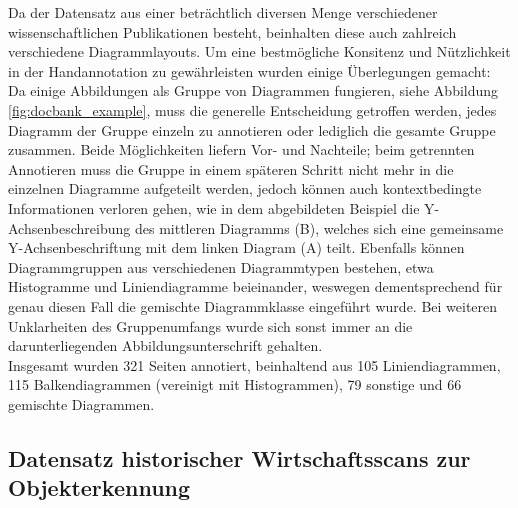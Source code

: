 Da der Datensatz aus einer beträchtlich diversen Menge verschiedener wissenschaftlichen Publikationen besteht, beinhalten diese auch zahlreich verschiedene Diagrammlayouts. Um eine bestmögliche Konsitenz und Nützlichkeit in der Handannotation zu gewährleisten wurden einige Überlegungen gemacht: Da einige Abbildungen als Gruppe von Diagrammen fungieren, siehe Abbildung \ref{fig:docbank_example}, muss die generelle Entscheidung getroffen werden, jedes Diagramm der Gruppe einzeln zu annotieren oder lediglich die gesamte Gruppe zusammen. Beide Möglichkeiten liefern Vor- und Nachteile; beim getrennten Annotieren muss die Gruppe in einem späteren Schritt nicht mehr in die einzelnen Diagramme aufgeteilt werden, jedoch können auch kontextbedingte Informationen verloren gehen, wie in dem abgebildeten Beispiel die Y-Achsenbeschreibung des mittleren Diagramms (B), welches sich eine gemeinsame Y-Achsenbeschriftung mit dem linken Diagram (A) teilt.
Ebenfalls können Diagrammgruppen aus verschiedenen Diagrammtypen bestehen, etwa Histogramme und Liniendiagramme beieinander, weswegen dementsprechend für genau diesen Fall die gemischte Diagrammklasse eingeführt wurde. Bei weiteren Unklarheiten des Gruppenumfangs wurde sich sonst immer an die darunterliegenden Abbildungsunterschrift gehalten.
\\
Insgesamt wurden 321 Seiten annotiert, beinhaltend aus 105 Liniendiagrammen, 115 Balkendiagrammen (vereinigt mit Histogrammen), 79 sonstige und 66 gemischte Diagrammen.

\subsection{Datensatz historischer Wirtschaftsscans zur Objekterkennung}

